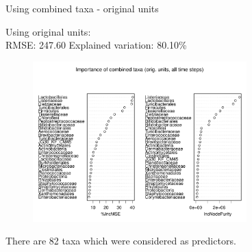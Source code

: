 \documentclass{beamer}
\begin{document}
\begin{frame}{Using combined taxa - original units}

  {\scriptsize
    
  \noindent Using original units:\\
  RMSE: 247.60  \hspace{0.05in}  Explained variation: 80.10\%

  \begin{center}
    \begin{figure}
      \includegraphics[width=3.25in]{../all_together/all_time_steps/orig_units_all_data_combined_imp_plot}
    \end{figure}
  \end{center}
  \vspace{-0.25in}

\noindent There are 82 taxa which were considered as predictors.
}

\end{frame}
\end{document}
